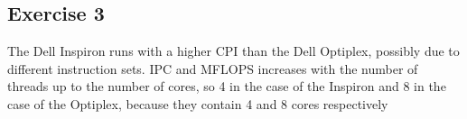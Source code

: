 \subsection{Exercise 3}
The Dell Inspiron runs with a higher CPI than the Dell Optiplex, possibly due to different instruction sets.
IPC and MFLOPS increases with the number of threads up to the number of cores, so 4 in the case of the Inspiron and 8 in the case of the Optiplex, because they contain 4 and 8 cores respectively

